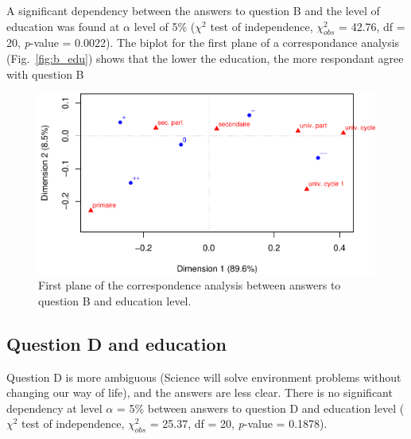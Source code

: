 \documentclass[Afour,times,sageh]{sagej}
\begin{document}
A significant dependency between the answers to question B and the level
of education was found at \(\alpha\) level of 5\% (\(\chi^2\) test of
independence, \(\chi^2_{obs}\) = 42.76, df = 20, \emph{p}-value =
0.0022). The biplot for the first plane of a correspondance analysis
(Fig.~\ref{fig:b_edu}) shows that the lower the education, the more
respondant agree with question B

\begin{figure}
\includegraphics[width=1\linewidth]{perception_of_science_files/figure-latex/fig_b_edu-1} \caption{First plane of the correspondence analysis between answers to question B and education level\label{fig:b_edu}.}\label{fig:fig_b_edu}
\end{figure}

\hypertarget{question-d-and-education}{%
\subsection{Question D and education}\label{question-d-and-education}}

Question D is more ambiguous (Science will solve environment problems
without changing our way of life), and the answers are less clear. There
is no significant dependency at level \(\alpha\) = 5\% between answers
to question D and education level (\(\chi^2\) test of independence,
\(\chi^2_{obs}\) = 25.37, df = 20, \emph{p}-value = 0.1878).
\end{document}
